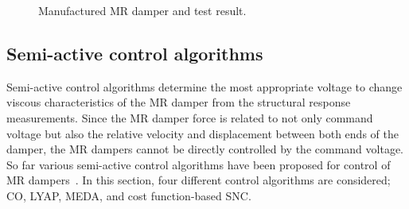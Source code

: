 \begin{figure}[!ht]
\centering
{}

\caption{Manufactured MR damper and test result.}
\label{fig:n3-6}
\end{figure}

\subsection{Semi-active control algorithms}

Semi-active control algorithms determine the most appropriate voltage to change viscous characteristics of the MR damper from the structural response measurements. Since the MR damper force is related to not only command voltage but also the relative velocity and displacement between both ends of the damper, the MR dampers cannot be directly controlled by the command voltage. So far various semi-active control algorithms have been proposed for control of MR dampers~\citep{jansen2000semiactive}. In this section, four different control algorithms are considered; CO, LYAP, MEDA, and cost function-based SNC.

